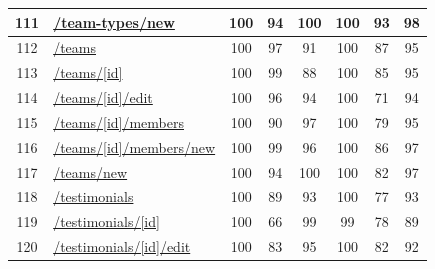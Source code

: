 \begin{longtable}{|c|p{5cm}|c|c|c|c|c|c|}
      \hline
      111                                      & \url{/team-types/new}                                      & 100              & 94               & 100              & 100              & 93               & 98            \\
      \hline
      112                                      & \url{/teams}                                               & 100              & 97               & 91               & 100              & 87               & 95            \\
      \hline
      113                                      & \url{/teams/[id]}                                          & 100              & 99               & 88               & 100              & 85               & 95            \\
      \hline
      114                                      & \url{/teams/[id]/edit}                                     & 100              & 96               & 94               & 100              & 71               & 94            \\
      \hline
      115                                      & \url{/teams/[id]/members}                                  & 100              & 90               & 97               & 100              & 79               & 95            \\
      \hline
      116                                      & \url{/teams/[id]/members/new}                              & 100              & 99               & 96               & 100              & 86               & 97            \\
      \hline
      117                                      & \url{/teams/new}                                           & 100              & 94               & 100              & 100              & 82               & 97            \\
      \hline
      118                                      & \url{/testimonials}                                        & 100              & 89               & 93               & 100              & 77               & 93            \\
      \hline
      119                                      & \url{/testimonials/[id]}                                   & 100              & 66               & 99               & 99               & 78               & 89            \\
      \hline
      120                                      & \url{/testimonials/[id]/edit}                              & 100              & 83               & 95               & 100              & 82               & 92            \\

\end{longtable}
